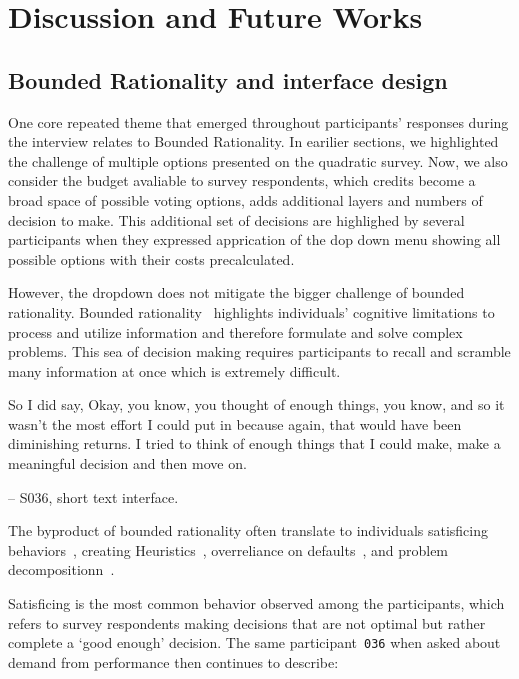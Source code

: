 \section{Discussion and Future Works}
\label{sec:discussion}

\subsection{Bounded Rationality and interface design}
One core repeated theme that emerged throughout participants' responses during the interview relates to Bounded Rationality. In earilier sections, we highlighted the challenge of multiple options presented on the quadratic survey. Now, we also consider the budget avaliable to survey respondents, which credits become a broad space of possible voting options, adds additional layers and numbers of decision to make. This additional set of decisions are highlighed by several participants when they expressed apprication of the dop down menu showing all possible options with their costs precalculated.

However, the dropdown does not mitigate the bigger challenge of bounded rationality. Bounded rationality~\cite{simonBehavioralModelRational1955} highlights individuals' cognitive limitations to process and utilize information and therefore formulate and solve complex problems. This sea of decision making requires participants to recall and scramble many information at once which is extremely difficult.

\begin{displayquote}
So I did say, Okay, you know, you thought of enough things, you know, and so it wasn't the most effort I could put in because again, that would have been diminishing returns. I tried to think of enough things that I could make, make a meaningful decision and then move on.

\noindent \hfill -- S036, short text interface.
\end{displayquote}

The byproduct of bounded rationality often translate to individuals satisficing behaviors~\cite{gigerenzerReasoningFastFrugal1996}, creating Heuristics~\cite{tverskyJudgmentUncertaintyHeuristics1974}, overreliance on defaults~\cite{thalerNudgeImprovingDecisions2008a}, and problem decompositionn~\cite{simonSciencesArtificial1996}. 

Satisficing is the most common behavior observed among the participants, which refers to survey respondents making decisions that are not optimal but rather complete a `good enough' decision. The same participant~\texttt{036} when asked about demand from performance then continues to describe:

